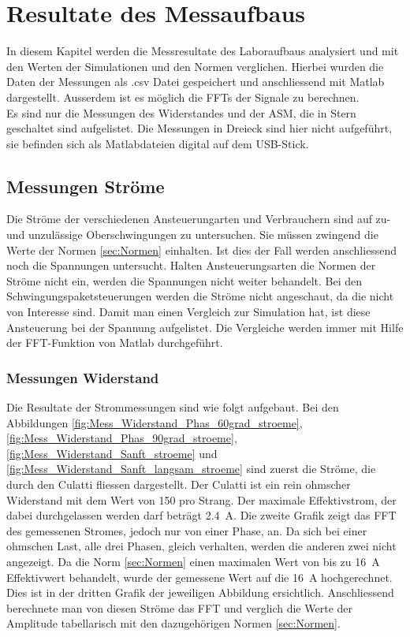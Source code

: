 \section{Resultate des Messaufbaus}
In diesem Kapitel werden die Messresultate des Laboraufbaus analysiert und mit den Werten der Simulationen und den Normen verglichen. Hierbei wurden die Daten der Messungen als .csv Datei gespeichert und anschliessend mit Matlab dargestellt. Ausserdem ist es möglich die FFTs der Signale zu berechnen.\\
Es sind nur die Messungen des Widerstandes und der ASM, die in Stern geschaltet sind aufgelistet. Die Messungen in Dreieck sind hier nicht aufgeführt, sie  befinden sich als Matlabdateien digital auf dem USB-Stick. 

\subsection{Messungen Ströme}
Die Ströme der verschiedenen Ansteuerungarten und Verbrauchern sind auf zu- und unzulässige Oberschwingungen zu untersuchen. Sie müssen zwingend die Werte der Normen \ref{sec:Normen} einhalten. Ist dies der Fall werden anschliessend noch die Spannungen untersucht. Halten Ansteuerungsarten die Normen der Ströme nicht ein, werden die Spannungen nicht weiter behandelt. Bei den Schwingungspaketsteuerungen werden die Ströme nicht angeschaut, da die nicht von Interesse sind. Damit man einen Vergleich zur Simulation hat, ist diese Ansteuerung bei der Spannung aufgelistet. Die Vergleiche werden immer mit Hilfe der FFT-Funktion von Matlab durchgeführt. 

\subsubsection{Messungen Widerstand}

Die Resultate der Strommessungen sind wie folgt aufgebaut. Bei den Abbildungen \ref{fig:Mess_Widerstand_Phas_60grad_stroeme}, \ref{fig:Mess_Widerstand_Phas_90grad_stroeme}, \ref{fig:Mess_Widerstand_Sanft_stroeme} und \ref{fig:Mess_Widerstand_Sanft_langsam_stroeme} sind zuerst die Ströme, die durch den Culatti fliessen dargestellt. Der Culatti ist ein rein ohmscher Widerstand mit dem Wert von \SI{150}{\Omega} pro Strang. Der maximale Effektivstrom, der dabei durchgelassen werden darf beträgt \SI{2.4}{A}. Die zweite Grafik zeigt das FFT des gemessenen Stromes, jedoch nur von einer Phase, an. Da sich bei einer ohmschen Last, alle drei Phasen, gleich verhalten, werden die anderen zwei nicht angezeigt. Da die Norm \ref{sec:Normen} einen maximalen Wert von bis zu \SI{16}{A} Effektivwert behandelt, wurde der gemessene Wert auf die \SI{16}{A} hochgerechnet. Dies ist in der dritten Grafik der jeweiligen Abbildung ersichtlich. Anschliessend berechnete man von diesen Ströme das FFT und verglich die Werte der Amplitude tabellarisch mit den dazugehörigen Normen \ref{sec:Normen}.

